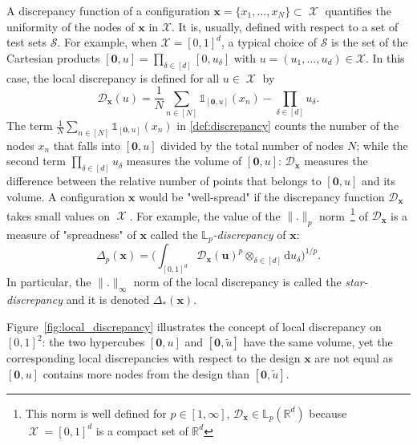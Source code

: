 \documentclass[twoside,11pt]{book}
\DeclareMathOperator{\X}{\mathcal{X}}
\begin{document}
 A discrepancy function of a configuration $\bm{x} = \{x_{1}, \dots, x_{N} \} \subset \X$ quantifies the uniformity of the nodes of $\bm{x}$ in $\mathcal{X}$. It is, usually, defined with respect to a set of test sets $\mathcal{S}$. For example, when $\mathcal{X} = [0,1]^{d}$, a typical choice of $\mathcal{S}$ is the set of the Cartesian products $[\bm{0},u] = \prod\limits_{\delta \in [d]}[0,u_{\delta}]$ with $u = (u_{1}, \dots, u_{d}) \in \mathcal{X}$. In this case, the local discrepancy is defined for all $u \in \X$ by 
\begin{equation}\label{def:discrepancy}
\mathcal{D}_{\bm{x}}(u) = \frac{1}{N}\sum\limits_{n \in [N]} \mathbb{1}_{[\bm{0},u]}(x_{n}) - \prod\limits_{\delta \in [d]}u_{\delta}.
\end{equation}  
The term $\displaystyle \frac{1}{N}\sum\limits_{n \in [N]} \mathbb{1}_{[\bm{0},u]}(x_{n})$ in \eqref{def:discrepancy} counts the number of the nodes $x_{n}$ that falls into $[\bm{0},u]$ divided by the total number of nodes $N$; while the second term $\displaystyle  \prod\limits_{\delta \in [d]}u_{\delta}$ measures the volume of $[\bm{0},u]$: $\mathcal{D}_{\bm{x}}$ measures the difference between the relative number of points that belongs to $[\bm{0},u]$ and its volume. A configuration $\bm{x}$ would be "well-spread" if the discrepancy function $\mathcal{D}_{\bm{x}}$ takes small values on $\X$. For example, the value of the $\|.\|_{p}$ norm~\footnote{This norm is well defined for $p \in [1,\infty]$, $\mathcal{D}_{\bm{x}} \in \mathbb{L}_{p}(\mathbb{R}^{d})$ because $\X = [0,1]^{d}$ is a compact set of $\mathbb{R}^{d}$} of $\mathcal{D}_{\bm{x}}$ is a measure of "spreadness" of $\bm{x}$ called the \emph{$\mathbb{L}_{p}$-discrepancy} of $\bm{x}$:
\begin{equation}
\Delta_{p}(\bm{x}) = \bigg(\int_{[0,1]^{d}}\mathcal{D}_{\bm{x}}(\bm{u})^{p} \otimes_{\delta \in [d]} \mathrm{d}u_{\delta}\bigg)^{1/p}.
\end{equation}
In particular, the $\|.\|_{\infty}$ norm of the local discrepancy is called the \emph{star-discrepancy} and it is denoted $\Delta_{*}(\bm{x})$.

Figure~\ref{fig:local_discrepancy} illustrates the concept of local discrepancy on $[0,1]^{2}$: the two hypercubes $[\bm{0},u]$ and $[\bm{0},\tilde{u}]$ have the same volume, yet the corresponding local discrepancies with respect to the design $\bm{x}$ are not equal as $[\bm{0},u]$ contains more nodes from the design than $[\bm{0},\tilde{u}]$.
\end{document}
